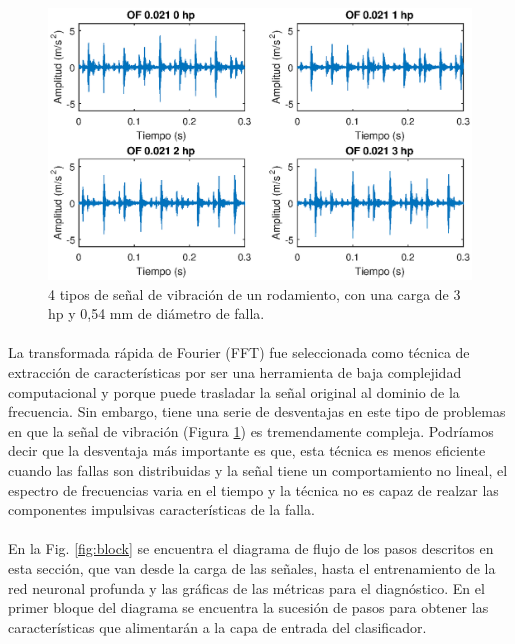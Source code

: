 \documentclass[12pt]{article}%
\begin{document}
\begin{figure}[ht]
  \centering
    \includegraphics[scale=0.9]{./signalOF.eps}
  \caption{4 tipos de señal de vibración de un rodamiento, con una carga de 3 hp y 0,54 mm de diámetro de falla.}
  \label{fig:senales}
\end{figure}

\paragraph{}
La transformada rápida de Fourier (FFT) fue seleccionada como técnica de extracción de características por ser una herramienta de baja complejidad computacional y porque puede trasladar la señal original al dominio de la frecuencia. Sin embargo, tiene una serie de desventajas en este tipo de problemas en que la señal de vibración (Figura \ref{fig:senales}) es tremendamente compleja. Podríamos decir que la desventaja más importante es que, esta técnica es menos eficiente cuando las fallas son distribuidas y la señal tiene un comportamiento no lineal, el espectro de frecuencias varia en el tiempo y la técnica no es capaz de realzar las componentes impulsivas características de la falla.

\paragraph{}
En la Fig. \ref{fig:block} se encuentra el diagrama de flujo de los pasos descritos en esta sección, que van desde la carga de las señales, hasta el entrenamiento de la red neuronal profunda y las gráficas de las métricas para el diagnóstico. En el primer bloque del diagrama se encuentra la sucesión de pasos para obtener las características que alimentarán a la capa de entrada del clasificador.
\end{document}
